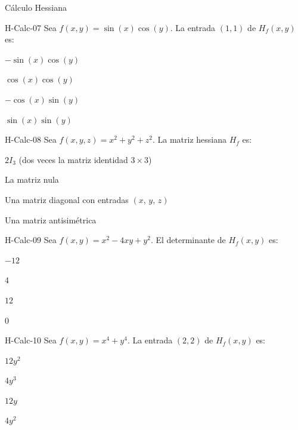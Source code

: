 \documentclass[a4,11pt]{aleph-notas}
\begin{document}
\begin{quiz}{Cálculo Hessiana}
\begin{multi}[]%
    {H-Calc-07}
    Sea $f(x,y) = \sin(x)\cos(y)$. La entrada $(1,1)$ de $H_f(x,y)$ es:
    \item* $-\sin(x)\cos(y)$
    \item $\cos(x)\cos(y)$
    \item $-\cos(x)\sin(y)$
    \item $\sin(x)\sin(y)$
\end{multi}

\begin{multi}[]%
    {H-Calc-08}
    Sea $f(x,y,z) = x^2 + y^2 + z^2$. La matriz hessiana $H_f$ es:
    \item* $2I_3$ (dos veces la matriz identidad $3\times 3$)
    \item La matriz nula
    \item Una matriz diagonal con entradas $(x,\, y,\, z)$
    \item Una matriz antisimétrica
\end{multi}

\begin{multi}[]%
    {H-Calc-09}
    Sea $f(x,y) = x^2 - 4xy + y^2$. El determinante de $H_f(x,y)$ es:
    \item* $-12$
    \item $4$
    \item $12$
    \item $0$
\end{multi}

\begin{multi}[]%
    {H-Calc-10}
    Sea $f(x,y) = x^4 + y^4$. La entrada $(2,2)$ de $H_f(x,y)$ es:
    \item* $12y^2$
    \item $4y^3$
    \item $12y$
    \item $4y^2$
\end{multi}

\end{quiz}
\end{document}
